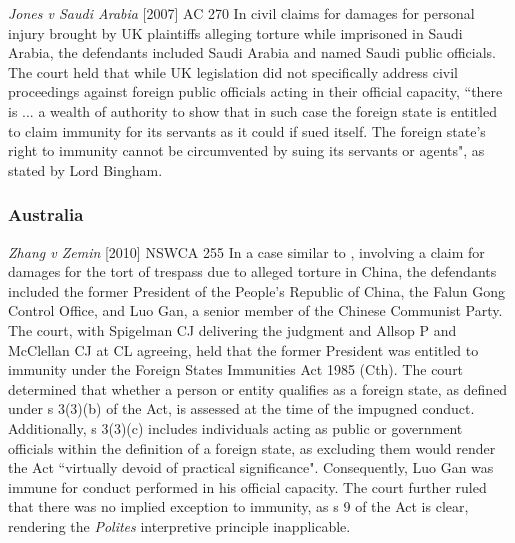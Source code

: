 \begin{casedetails}{\textit{Jones v Saudi Arabia} [2007] AC 270}
    \flushleft
    In civil claims for damages for personal injury brought by UK plaintiffs alleging torture while imprisoned in Saudi Arabia, the defendants included Saudi Arabia and named Saudi public officials. The court held that while UK legislation did not specifically address civil proceedings against foreign public officials acting in their official capacity, ``there is ... a wealth of authority to show that in such case the foreign state is entitled to claim immunity for its servants as it could if sued itself. The foreign state's right to immunity cannot be circumvented by suing its servants or agents", as stated by Lord Bingham.
\end{casedetails}

\subsubsection{Australia}
\begin{casedetails}{\textit{Zhang v Zemin} [2010] NSWCA 255}
    \flushleft
    In a case similar to , involving a claim for damages for the tort of trespass due to alleged torture in China, the defendants included the former President of the People's Republic of China, the Falun Gong Control Office, and Luo Gan, a senior member of the Chinese Communist Party. The court, with Spigelman CJ delivering the judgment and Allsop P and McClellan CJ at CL agreeing, held that the former President was entitled to immunity under the Foreign States Immunities Act 1985 (Cth). The court determined that whether a person or entity qualifies as a foreign state, as defined under s 3(3)(b) of the Act, is assessed at the time of the impugned conduct. Additionally, s 3(3)(c) includes individuals acting as public or government officials within the definition of a foreign state, as excluding them would render the Act ``virtually devoid of practical significance". Consequently, Luo Gan was immune for conduct performed in his official capacity. The court further ruled that there was no implied exception to immunity, as s 9 of the Act is clear, rendering the \textit{Polites} interpretive principle inapplicable.
\end{casedetails}